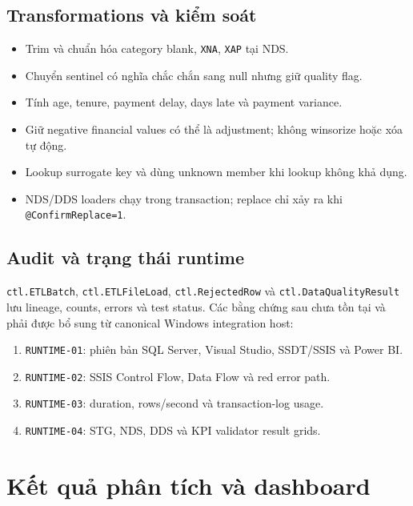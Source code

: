 \documentclass[12pt,a4paper,oneside]{report}
\newcommand{\evidence}[1]{\texttt{#1}}
\begin{document}
\section{Transformations và kiểm soát}
\begin{itemize}
  \item Trim và chuẩn hóa category blank, \texttt{XNA}, \texttt{XAP} tại NDS.
  \item Chuyển sentinel có nghĩa chắc chắn sang null nhưng giữ quality flag.
  \item Tính age, tenure, payment delay, days late và payment variance.
  \item Giữ negative financial values có thể là adjustment; không winsorize hoặc xóa tự động.
  \item Lookup surrogate key và dùng unknown member khi lookup không khả dụng.
  \item NDS/DDS loaders chạy trong transaction; replace chỉ xảy ra khi \texttt{@ConfirmReplace=1}.
\end{itemize}

\section{Audit và trạng thái runtime}
\texttt{ctl.ETLBatch}, \texttt{ctl.ETLFileLoad}, \texttt{ctl.RejectedRow} và \texttt{ctl.DataQualityResult} lưu lineage, counts, errors và test status. Các bằng chứng sau chưa tồn tại và phải được bổ sung từ canonical Windows integration host:
\begin{enumerate}
  \item \evidence{RUNTIME-01}: phiên bản SQL Server, Visual Studio, SSDT/SSIS và Power BI.
  \item \evidence{RUNTIME-02}: SSIS Control Flow, Data Flow và red error path.
  \item \evidence{RUNTIME-03}: duration, rows/second và transaction-log usage.
  \item \evidence{RUNTIME-04}: STG, NDS, DDS và KPI validator result grids.
\end{enumerate}

\chapter{Kết quả phân tích và dashboard}
\end{document}

